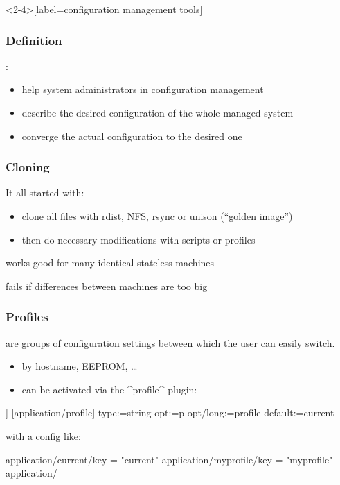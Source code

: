 \begin{frame}<2-4>[label=configuration management tools]
	\frametitle{Definition}

	:

	\pause

	\begin{itemize}[<+-| alert@+>]
	\item help system administrators in configuration management
	\item describe the desired configuration of the whole managed system
	\item converge the actual configuration to the desired one~\cite{burgess1995cfengine}
	\end{itemize}
\end{frame}

\begin{frame}
	\frametitle{Cloning}

	It all started with:

	\begin{itemize}[<+-| alert@+>]
	\item clone all files with rdist, NFS, rsync or unison (``golden image'')
	\item then do necessary modifications with scripts or profiles
	\end{itemize}

	\vspace{1cm}
	\pause[\thebeamerpauses]

	\begin{description}[<+-| alert@+>]
	\item[$+$] works good for many identical stateless machines
	\item[$-$] fails if differences between machines are too big
	\end{description}
\end{frame}

\begin{frame}[fragile]
	\frametitle{Profiles}

	 are groups of configuration settings between which the user can easily switch.
	\begin{itemize}
	\item by hostname, EEPROM, \dots
	\item can be activated via the ^profile^ plugin:
	\end{itemize}

	\begin{code}[morekeywords={long},gobble=4]]
	[application/profile]
	type:=string
	opt:=p
	opt/long:=profile
	default:=current
	\end{code}

	\pause
	with a config like:
	\begin{code}[gobble=4,language=CfgElektra]
	application/current/key = "current"
	application/myprofile/key = "myprofile"
	application/%
	\end{code}
\end{frame}

